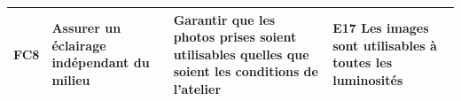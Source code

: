 \begin{landscape}
\begin{longtable}{|>{\raggedright\arraybackslash}p{1cm}|p{4.5cm}|p{5.5cm}|p{10.5cm}|}
FC8 & Assurer un éclairage indépendant du milieu & Garantir que les photos prises soient utilisables quelles que soient les conditions de l'atelier
    & \rule[-0.4\baselineskip]{0pt}{1.8\baselineskip}\textbf{E17} Les images sont utilisables à toutes les luminosités \\
\hline

\end{longtable}

\end{landscape}
